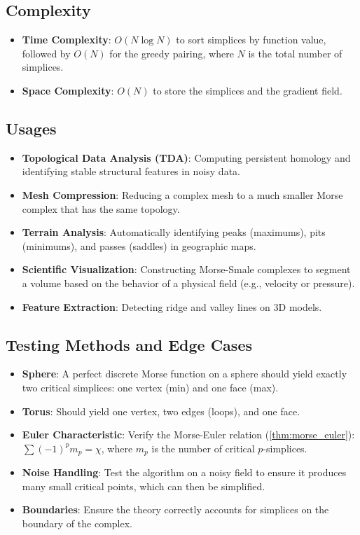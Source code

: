 \subsection{Complexity}
\begin{itemize}
    \item \textbf{Time Complexity}: $O(N \log N)$ to sort simplices by function value, followed by $O(N)$ for the greedy pairing, where $N$ is the total number of simplices.
    \item \textbf{Space Complexity}: $O(N)$ to store the simplices and the gradient field.
\end{itemize}

\subsection{Usages}
\begin{itemize}
    \item \textbf{Topological Data Analysis (TDA)}: Computing persistent homology and identifying stable structural features in noisy data.
    \item \textbf{Mesh Compression}: Reducing a complex mesh to a much smaller Morse complex that has the same topology.
    \item \textbf{Terrain Analysis}: Automatically identifying peaks (maximums), pits (minimums), and passes (saddles) in geographic maps.
    \item \textbf{Scientific Visualization}: Constructing Morse-Smale complexes to segment a volume based on the behavior of a physical field (e.g., velocity or pressure).
    \item \textbf{Feature Extraction}: Detecting ridge and valley lines on 3D models.
\end{itemize}

\subsection{Testing Methods and Edge Cases}
\begin{itemize}
    \item \textbf{Sphere}: A perfect discrete Morse function on a sphere should yield exactly two critical simplices: one vertex (min) and one face (max).
    \item \textbf{Torus}: Should yield one vertex, two edges (loops), and one face.
    \item \textbf{Euler Characteristic}: Verify the Morse-Euler relation (\cref{thm:morse_euler}): $\sum (-1)^p m_p = \chi$, where $m_p$ is the number of critical $p$-simplices.
    \item \textbf{Noise Handling}: Test the algorithm on a noisy field to ensure it produces many small critical points, which can then be simplified.
    \item \textbf{Boundaries}: Ensure the theory correctly accounts for simplices on the boundary of the complex.
\end{itemize}

